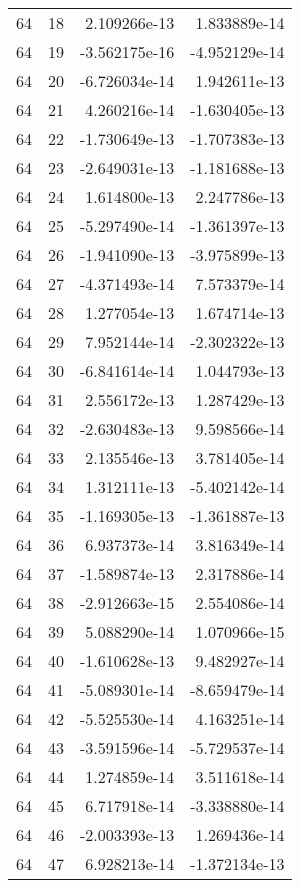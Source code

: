 \begin{tabular}{rrrr}
  64 &   18 &  2.109266e-13 &  1.833889e-14 \\
  64 &   19 & -3.562175e-16 & -4.952129e-14 \\
  64 &   20 & -6.726034e-14 &  1.942611e-13 \\
  64 &   21 &  4.260216e-14 & -1.630405e-13 \\
  64 &   22 & -1.730649e-13 & -1.707383e-13 \\
  64 &   23 & -2.649031e-13 & -1.181688e-13 \\
  64 &   24 &  1.614800e-13 &  2.247786e-13 \\
  64 &   25 & -5.297490e-14 & -1.361397e-13 \\
  64 &   26 & -1.941090e-13 & -3.975899e-13 \\
  64 &   27 & -4.371493e-14 &  7.573379e-14 \\
  64 &   28 &  1.277054e-13 &  1.674714e-13 \\
  64 &   29 &  7.952144e-14 & -2.302322e-13 \\
  64 &   30 & -6.841614e-14 &  1.044793e-13 \\
  64 &   31 &  2.556172e-13 &  1.287429e-13 \\
  64 &   32 & -2.630483e-13 &  9.598566e-14 \\
  64 &   33 &  2.135546e-13 &  3.781405e-14 \\
  64 &   34 &  1.312111e-13 & -5.402142e-14 \\
  64 &   35 & -1.169305e-13 & -1.361887e-13 \\
  64 &   36 &  6.937373e-14 &  3.816349e-14 \\
  64 &   37 & -1.589874e-13 &  2.317886e-14 \\
  64 &   38 & -2.912663e-15 &  2.554086e-14 \\
  64 &   39 &  5.088290e-14 &  1.070966e-15 \\
  64 &   40 & -1.610628e-13 &  9.482927e-14 \\
  64 &   41 & -5.089301e-14 & -8.659479e-14 \\
  64 &   42 & -5.525530e-14 &  4.163251e-14 \\
  64 &   43 & -3.591596e-14 & -5.729537e-14 \\
  64 &   44 &  1.274859e-14 &  3.511618e-14 \\
  64 &   45 &  6.717918e-14 & -3.338880e-14 \\
  64 &   46 & -2.003393e-13 &  1.269436e-14 \\
  64 &   47 &  6.928213e-14 & -1.372134e-13 \\

\end{tabular}
